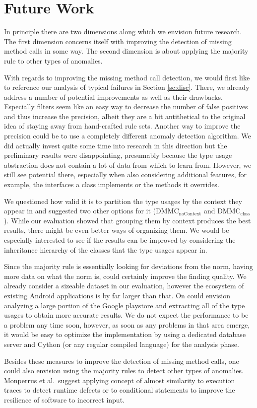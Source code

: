 \section{Future Work}

In principle there are two dimensions along which we envision future research.
The first dimension concerns itself with improving the detection of missing method calls in some way.
The second dimension is about applying the majority rule to other types of anomalies.

With regards to improving the missing method call detection, we would first like to reference our analysis of typical failures in Section \ref{sc:disc}.
There, we already address a number of potential improvements as well as their drawbacks.
Especially filters seem like an easy way to decrease the number of false positives and thus increase the precision, albeit they are a bit antithetical to the original idea of staying away from hand-crafted rule sets.
Another way to improve the precision could be to use a completely different anomaly detection algorithm.
We did actually invest quite some time into research in this direction but the preliminary results were disappointing, presumably because the type usage abstraction does not contain a lot of data from which to learn from.
However, we still see potential there, especially when also considering additional features, for example, the interfaces a class implements or the methods it overrides.

We questioned how valid it is to partition the type usages by the context they appear in and suggested two other options for it ($\text{DMMC}_\text{noContext}$ and $\text{DMMC}_\text{class}$).
While our evaluation showed that grouping them by context produces the best results, there might be even better ways of organizing them.
We would be especially interested to see if the results can be improved by considering the inheritance hierarchy of the classes that the type usages appear in.

Since the majority rule is essentially looking for deviations from the norm, having more data on what the norm is, could certainly improve the finding quality.
We already consider a sizeable dataset in our evaluation, however the ecosystem of existing Android applications is by far larger than that.
On could envision analyzing a large portion of the Google playstore and extracting all of the type usages to obtain more accurate results.
We do not expect the performance to be a problem any time soon, however, as soon as any problems in that area emerge, it would be easy to optimize the implementation by using a dedicated database server and Cython (or any regular compiled language) for the analysis phase.

Besides these measures to improve the detection of missing method calls, one could also envision using the majority rules to detect other types of anomalies.
Monperrus et al.\ suggest applying concept of almost similarity to execution traces to detect runtime defects or to conditional statements to improve the resilience of software to incorrect input.
